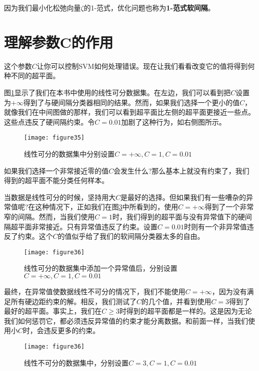 因为我们最小化松弛向量$\zeta$的1-范式，优化问题也称为\textbf{1-范式软间隔}。



\section{理解参数C的作用}

这个参数$C$让你可以控制SVM如何处理错误。现在让我们看看改变它的值将得到何种不同的超平面。

图\ref{figure35}显示了我们在本书中使用的线性可分数据集。在左边，我们可以看到把$C$设置为$+\infty$得到了与硬间隔分类器相同的结果。然而，如果我们选择一个更小的值$C$，就像我们在中间图做的那样，我们可以看到超平面比左侧的超平面更接近一些点。这些点违反了硬间隔约束。令$C=0.01$加剧了这种行为，如右侧图所示。

\begin{figure}[ht]
	\centering
	\texttt{[image: figure35]}
	\caption{线性可分的数据集中分别设置$C=+\infty,C=1,C=0.01$}
	\label{figure35}
\end{figure}

如果我们选择一个非常接近零的值$C$会发生什么?那么基本上就没有约束了，我们得到的超平面不能分类任何样本。

当数据是线性可分的时候，坚持用大$C$是最好的选择。但如果我们有一些嘈杂的异常值呢?在这种情况下，正如我们在图\ref{figure36}中所看到的，使用$C=+\infty$得到了一个非常窄的间隔。然而，当我们使用$C=1$时，我们得到的超平面与没有异常值下的硬间隔超平面非常接近。只有异常值违反了约束。设置$C=0.01$时则有一个非异常值违反了约束。这个$C$的值似乎给了我们的软间隔分类器太多的自由。

\begin{figure}[ht]
	\centering
	\texttt{[image: figure36]}
	\caption{线性可分的数据集中添加一个异常值后，分别设置$C=+\infty,C=1,C=0.01$}
	\label{figure36}
\end{figure}

最终，在异常值使数据线性不可分的情况下，我们不能使用$C=+\infty$，因为没有满足所有硬边距约束的解。相反，我们测试了$C$的几个值，并看到使用$C=3$得到了最好的超平面。事实上，我们在$C \geq 3$时得到的超平面都是一样的。这是因为无论我们如何惩罚它，都必须违反异常值的约束才能分离数据。和前面一样，当我们使用小$C$时，会违反更多的约束。

\begin{figure}[ht]
	\centering
	\texttt{[image: figure36]}
	\caption{线性不可分的数据集中，分别设置$C=3,C=1,C=0.01$}
	\label{figure36}
\end{figure}

